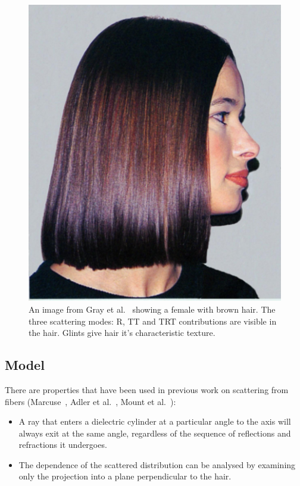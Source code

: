 \documentclass[11pt,a4paper]{report}
\begin{document}
\begin{figure}[h]
\begin{center}
\includegraphics[scale=0.2]{images/female_marschner.jpeg}
\caption{An image from Gray et al.~\cite{gray} showing a female with brown hair. The three scattering modes: R, TT and TRT contributions are visible in the hair. Glints give hair it's characteristic texture.}
\label{female_hair}
\end{center}
\end{figure}

\subsection{Model}

There are properties that have been used in previous work on scattering from fibers (Marcuse~\cite{marcuse1974}, Adler et al.~\cite{adler1998}, Mount et al.~\cite{mount1998}):

\begin{itemize}
\item A ray that enters a dielectric cylinder at a particular angle to the axis will always exit at the same angle, regardless of the sequence of reflections and refractions it undergoes.

\item The dependence of the scattered distribution can be analysed by examining only the projection into a plane perpendicular to the hair.
\end{itemize}
\end{document}
